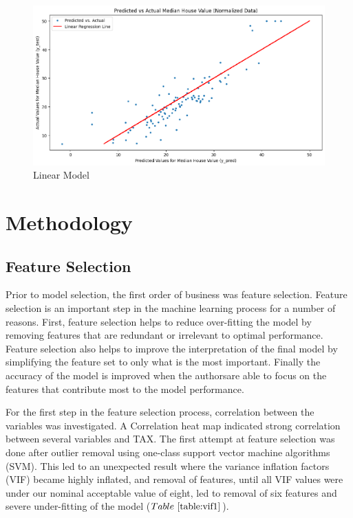 \documentclass[conference, 11pt]{IEEEtran}
\begin{document}
\begin{figure}
    \centering
    \includegraphics[width=1\linewidth]{linear.png}
    \caption{Linear Model}
    \label{fig:linear}
\end{figure}

\section{Methodology}

\subsection{Feature Selection}

Prior to model selection, the first order of business was feature selection. Feature selection is an important step in the machine learning process for a number of reasons. First, feature selection helps to reduce over-fitting the model by removing features that are redundant or irrelevant to optimal performance. Feature selection also helps to improve the interpretation of the final model by simplifying the feature set to only what is the most important. Finally the accuracy of the model is improved when the authorsare able to focus on the features that contribute most to the model performance. 

For the first step in the feature selection process, correlation between the variables was investigated. A Correlation heat map indicated strong correlation between several variables and TAX. The first attempt at feature selection was done after outlier removal using one-class support vector machine algorithms (SVM). This led to an unexpected result where the variance inflation factors (VIF) became highly inflated, and removal of features, until all VIF values were under our nominal acceptable value of eight, led to removal of six features and severe under-fitting of the model ($Table~\ref{table:vif1}$). 
\end{document}

